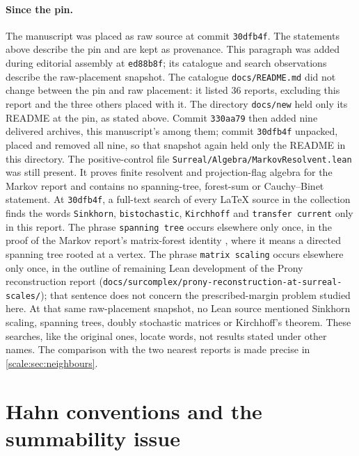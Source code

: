 \documentclass[11pt,a4paper]{article}
\numberwithin{equation}{section}
\theoremstyle{definition}
\begin{document}
\paragraph{Since the pin.}
The manuscript was placed as raw source at commit \texttt{30dfb4f}. The
statements above describe the pin and are kept as provenance. This paragraph
was added during editorial assembly at \texttt{ed88b8f}; its catalogue and
search observations describe the raw-placement snapshot. The catalogue
\texttt{docs/README.md} did not change between the pin and raw placement:
it listed 36 reports, excluding this report and the three others placed
with it. The directory
\texttt{docs/new} held only its README at the pin, as stated above. Commit
\texttt{330aa79} then added nine delivered archives, this manuscript's among
them; commit \texttt{30dfb4f} unpacked, placed and removed all nine, so that
snapshot again held only the README in this directory. The positive-control
file \nolinkurl{Surreal/Algebra/MarkovResolvent.lean} was still present. It proves
finite resolvent and projection-flag algebra for the Markov report and
contains no spanning-tree, forest-sum or Cauchy--Binet statement.
At \texttt{30dfb4f}, a full-text search of every LaTeX source in the
collection finds the words \texttt{Sinkhorn}, \texttt{bistochastic},
\texttt{Kirchhoff} and \texttt{transfer current} only in this report.
The phrase \texttt{spanning tree} occurs elsewhere only once, in the proof of
the Markov report's matrix-forest identity \cite{RepoMarkov}, where it
means a directed spanning tree rooted at a vertex. The phrase
\texttt{matrix scaling} occurs elsewhere only once, in the outline of
remaining Lean development of the Prony reconstruction report
(\nolinkurl{docs/surcomplex/prony-reconstruction-at-surreal-scales/}); that
sentence does not concern the prescribed-margin problem studied here. At that same raw-placement snapshot, no
Lean source mentioned Sinkhorn scaling, spanning trees, doubly stochastic
matrices or Kirchhoff's theorem. These searches, like the original ones,
locate words, not results stated under other names. The comparison with the
two nearest reports is made precise in \cref{scale:sec:neighbours}.

\section{Hahn conventions and the summability issue}\label{scale:sec:hahn}
\end{document}
